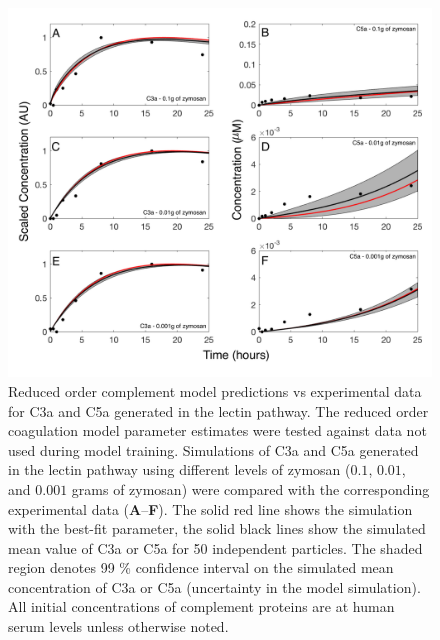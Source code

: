 \documentclass[12pt]{article}
\begin{document}
\begin{figure}[h]
\centering
\includegraphics[width=1.0\textwidth]{./figs/Figure3_Predictions_2.pdf}
\caption{Reduced order complement model predictions vs experimental data for C3a and C5a generated in the lectin pathway. The reduced order coagulation model parameter estimates were tested against data not used during model training. Simulations of C3a and C5a generated in the lectin pathway using different levels of zymosan ($0.1$, $0.01$, and $0.001$ grams of zymosan) were compared with the corresponding experimental data (\textbf{A}--\textbf{F}). The solid red line shows the simulation with the best-fit parameter, the solid black lines show the simulated mean value of C3a or C5a for 50 independent particles. The shaded region denotes 99 \% confidence interval on the simulated mean concentration of C3a or C5a (uncertainty in the model simulation). All initial concentrations of complement proteins are at human serum levels unless otherwise noted.
}\label{fig-prediction}
\end{figure}
\end{document}
